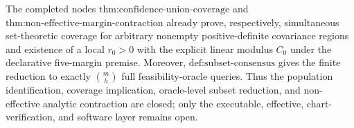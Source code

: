 The completed nodes \(\text{thm:confidence-union-coverage}\) and \(\text{thm:non-effective-margin-contraction}\) already prove, respectively, simultaneous set-theoretic coverage for arbitrary nonempty positive-definite covariance regions and existence of a local \(r_0>0\) with the explicit linear modulus \(C_0\) under the declarative five-margin premise. Moreover, \(\text{def:subset-consensus}\) gives the finite reduction to exactly \(\binom{m}{h}\) full feasibility-oracle queries. Thus the population identification, coverage implication, oracle-level subset reduction, and non-effective analytic contraction are closed; only the executable, effective, chart-verification, and software layer remains open.
